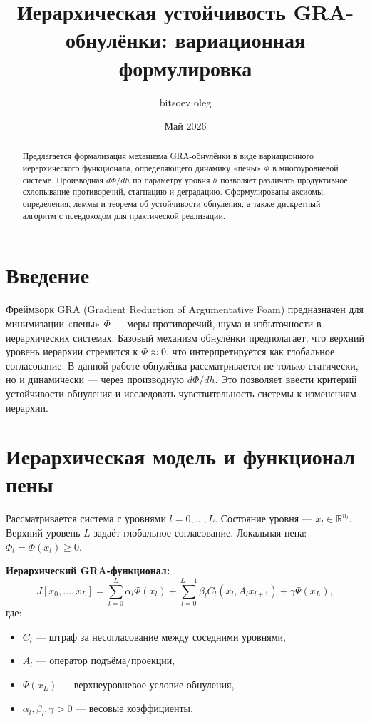 \documentclass[11pt,a4paper]{article}
\title{Иерархическая устойчивость GRA-обнулёнки: вариационная формулировка}
\author{bitsoev oleg}
\date{Май 2026}
\begin{document}

\maketitle

\begin{abstract}
Предлагается формализация механизма GRA-обнулёнки в виде вариационного иерархического функционала, определяющего динамику «пены» $\Phi$ в многоуровневой системе. Производная $d\Phi/dh$ по параметру уровня $h$ позволяет различать продуктивное схлопывание противоречий, стагнацию и деградацию. Сформулированы аксиомы, определения, леммы и теорема об устойчивости обнуления, а также дискретный алгоритм с псевдокодом для практической реализации.
\end{abstract}

\section{Введение}

Фреймворк GRA (Gradient Reduction of Argumentative Foam) предназначен для минимизации «пены» $\Phi$ --- меры противоречий, шума и избыточности в иерархических системах. Базовый механизм обнулёнки предполагает, что верхний уровень иерархии стремится к $\Phi \approx 0$, что интерпретируется как глобальное согласование. В данной работе обнулёнка рассматривается не только статически, но и динамически --- через производную $d\Phi/dh$. Это позволяет ввести критерий устойчивости обнуления и исследовать чувствительность системы к изменениям иерархии.

\section{Иерархическая модель и функционал пены}

Рассматривается система с уровнями $l = 0,\dots,L$. Состояние уровня --- $x_l \in \mathbb{R}^{n_l}$. Верхний уровень $L$ задаёт глобальное согласование. Локальная пена: $\Phi_l = \Phi(x_l) \geq 0$.

\textbf{Иерархический GRA-функционал:}
\begin{equation}
J[x_0,\dots,x_L] = \sum_{l=0}^L \alpha_l \Phi(x_l) + \sum_{l=0}^{L-1} \beta_l C_l(x_l, A_l x_{l+1}) + \gamma \Psi(x_L),
\label{eq:gra-functional}
\end{equation}
где:
\begin{itemize}
    \item $C_l$ --- штраф за несогласование между соседними уровнями,
    \item $A_l$ --- оператор подъёма/проекции,
    \item $\Psi(x_L)$ --- верхнеуровневое условие обнуления,
    \item $\alpha_l, \beta_l, \gamma > 0$ --- весовые коэффициенты.
\end{itemize}
\end{document}
